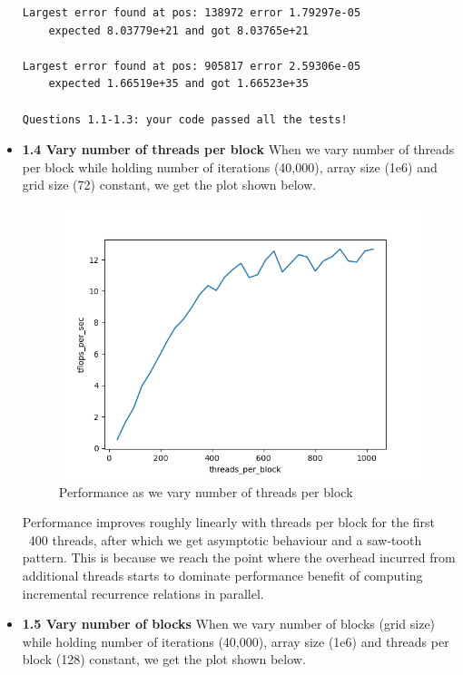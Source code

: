 \documentclass[12pt,letterpaper,twoside]{article}
\begin{document}
\begin{itemize}
\begin{verbatim}
Largest error found at pos: 138972 error 1.79297e-05 
    expected 8.03779e+21 and got 8.03765e+21

Largest error found at pos: 905817 error 2.59306e-05 
    expected 1.66519e+35 and got 1.66523e+35

Questions 1.1-1.3: your code passed all the tests!
\end{verbatim}

    \item \textbf{1.4 Vary number of threads per block} When we 
    vary number of threads per block while holding number of 
    iterations (40,000), array size (1e6) and grid size (72) 
    constant, we get the plot shown below. 
    
    \begin{figure}[h]
        \center
        \includegraphics[scale=0.7]{q1_4.png}
        \caption{Performance as we vary number of threads per block}
    \end{figure}

    Performance improves roughly linearly with threads per block 
    for the first ~400 threads, after which we get asymptotic 
    behaviour and a saw-tooth pattern. This is because we reach 
    the point where the overhead incurred from additional threads
    starts to dominate performance benefit of computing incremental 
    recurrence relations in parallel.

    \item \textbf{1.5 Vary number of blocks} When we 
    vary number of blocks (grid size) while holding number of 
    iterations (40,000), array size (1e6) and threads per block 
    (128) constant, we get the plot shown below. 


\end{itemize}
\end{document}
